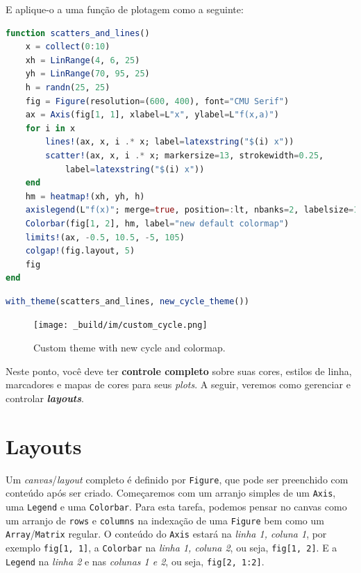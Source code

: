 \documentclass[
  notoc %
]{tufte-book}
\newcommand{\passthrough}[1]{#1}
\begin{document}
E aplique-o a uma função de plotagem como a seguinte:

\begin{lstlisting}[language=Julia]
function scatters_and_lines()
    x = collect(0:10)
    xh = LinRange(4, 6, 25)
    yh = LinRange(70, 95, 25)
    h = randn(25, 25)
    fig = Figure(resolution=(600, 400), font="CMU Serif")
    ax = Axis(fig[1, 1], xlabel=L"x", ylabel=L"f(x,a)")
    for i in x
        lines!(ax, x, i .* x; label=latexstring("$(i) x"))
        scatter!(ax, x, i .* x; markersize=13, strokewidth=0.25,
            label=latexstring("$(i) x"))
    end
    hm = heatmap!(xh, yh, h)
    axislegend(L"f(x)"; merge=true, position=:lt, nbanks=2, labelsize=14)
    Colorbar(fig[1, 2], hm, label="new default colormap")
    limits!(ax, -0.5, 10.5, -5, 105)
    colgap!(fig.layout, 5)
    fig
end
\end{lstlisting}

\begin{lstlisting}[language=Julia]
with_theme(scatters_and_lines, new_cycle_theme())
\end{lstlisting}

\begin{figure}
\hypertarget{fig:custom_cycle}{%
\centering
\texttt{[image: \_build/im/custom\_cycle.png]}
\caption{Custom theme with new cycle and
colormap.}\label{fig:custom_cycle}
}
\end{figure}

Neste ponto, você deve ter \textbf{controle completo} sobre suas cores,
estilos de linha, marcadores e mapas de cores para seus \emph{plots}. A
seguir, veremos como gerenciar e controlar \textbf{\emph{layouts}}.

\hypertarget{sec:makie_layouts}{%
\section{Layouts}\label{sec:makie_layouts}}

Um \emph{canvas}/\emph{layout} completo é definido por
\passthrough{\lstinline!Figure!}, que pode ser preenchido com conteúdo
após ser criado. Começaremos com um arranjo simples de um
\passthrough{\lstinline!Axis!}, uma \passthrough{\lstinline!Legend!} e
uma \passthrough{\lstinline!Colorbar!}. Para esta tarefa, podemos pensar
no canvas como um arranjo de \passthrough{\lstinline!rows!} e
\passthrough{\lstinline!columns!} na indexação de uma
\passthrough{\lstinline!Figure!} bem como um
\passthrough{\lstinline!Array!}/\passthrough{\lstinline!Matrix!}
regular. O conteúdo do \passthrough{\lstinline!Axis!} estará na
\emph{linha 1, coluna 1}, por exemplo
\passthrough{\lstinline!fig[1, 1]!}, a
\passthrough{\lstinline!Colorbar!} na \emph{linha 1, coluna 2}, ou seja,
\passthrough{\lstinline!fig[1, 2]!}. E a
\passthrough{\lstinline!Legend!} na \emph{linha 2} e nas \emph{colunas 1
e 2}, ou seja, \passthrough{\lstinline!fig[2, 1:2]!}.
\end{document}
